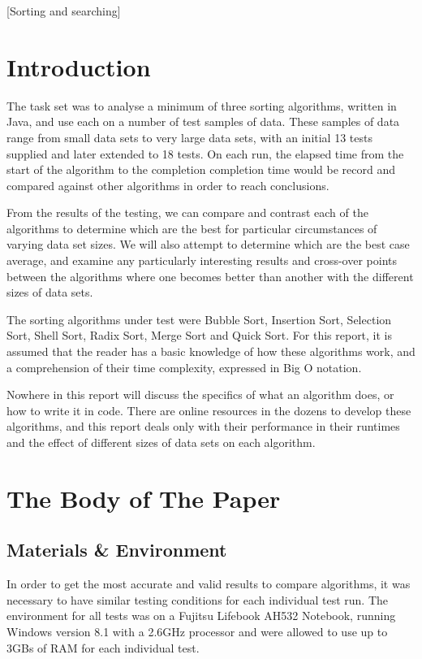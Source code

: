 \documentclass{acm_proc_article-sp}
\begin{document}
[Sorting and searching]



\section{Introduction}
The task set\cite{assignment} was to analyse a minimum of three sorting algorithms,
written in Java, and use each on a number of test samples of data.
These samples of data range from small data sets to very large data
sets, with an initial 13 tests supplied and later extended to 18 tests. 
On each run, the elapsed time from the start of the algorithm to
the completion completion time would be record and compared against
other algorithms in order to reach conclusions.

From the results of the testing, we can compare and contrast each
of the algorithms to determine which are the best for particular
circumstances of varying data set sizes. We will also attempt to 
determine which are the best case average, and examine any particularly 
interesting results and cross-over points between the algorithms 
where one becomes better than another with the different sizes of 
data sets.

The sorting algorithms under test were Bubble Sort, Insertion Sort,
Selection Sort, Shell Sort, Radix Sort, Merge Sort and Quick Sort. For this
report, it is assumed that the reader has a basic knowledge of how these
algorithms work, and a comprehension of their time complexity\cite{complexity}, expressed
in Big O\cite{bigo} notation.

Nowhere in this report will discuss the specifics of what
an algorithm does, or how to write it in code. There are online
resources in the dozens to develop these algorithms, and this report
deals only with their performance in their runtimes and the effect of
different sizes of data sets on each algorithm.


\section{The {\secit Body} of The Paper}

\subsection{Materials \& Environment}
In order to get the most accurate and valid results to compare algorithms,
it was necessary to have similar testing conditions for each individual test run.
The environment for all tests was on a Fujitsu Lifebook AH532 Notebook,
running Windows version 8.1 with a 2.6GHz processor and were allowed 
to use up to 3GBs of RAM for each individual test.
\end{document}

